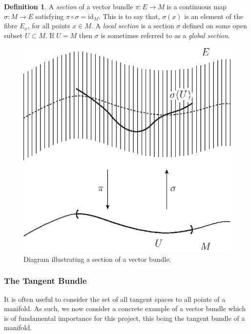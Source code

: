 \documentclass[12pt,a4paper]{article}
\numberwithin{equation}{section}
\theoremstyle{definition}
\newtheorem{definition}{Definition}[section]
\theoremstyle{remark}
\begin{document}
\begin{definition}
A \textit{section} of a vector bundle $\pi:E\to M$ is a continuous map $\sigma:M\to E$ satisfying $\pi\circ\sigma=\mathrm{id}_M$. This is to say that, $\sigma(x)$ is an element of the fibre $E_x$, for all points $x\in M$. A \textit{local section} is a section $\sigma$ defined on some open subset $U\subset M$. If $U=M$ then $\sigma$ is sometimes referred to as a \textit{global section}.
\end{definition}

\begin{figure}[h!]
\centering
\includegraphics[scale=0.75]{fig/section-1}
\caption{Diagram illustrating a section of a vector bundle.}
\label{fig:section-1}
\end{figure}

\subsubsection{The Tangent Bundle}
It is often useful to consider the set of all tangent spaces to all points of a manifold. As such, we now consider a concrete example of a vector bundle which is of fundamental importance for this project, this being the tangent bundle of a manifold.

\pagebreak
\end{document}
